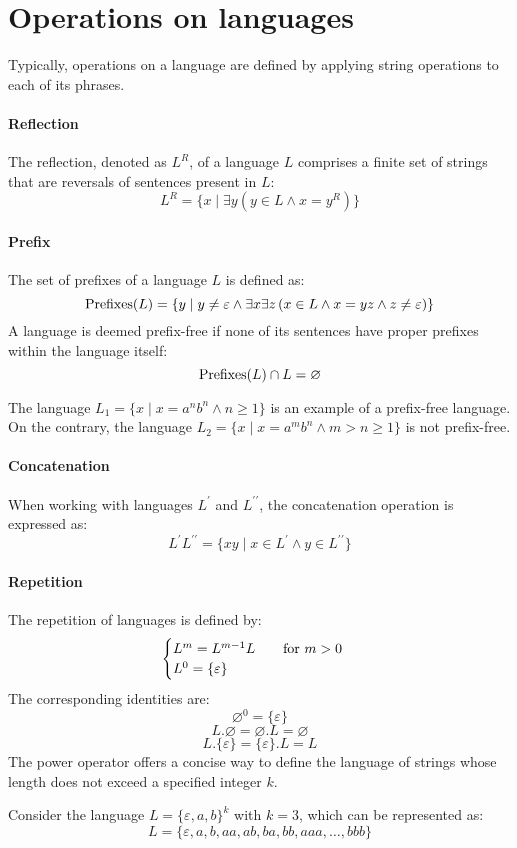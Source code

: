 \section{Operations on languages}

Typically, operations on a language are defined by applying string operations to each of its phrases.

\paragraph*{Reflection}
The reflection, denoted as $L^R$, of a language $L$ comprises a finite set of strings that are reversals of sentences present in $L$:
\[L^R = \{ x \mid \exists y \left( y \in L \land x=y^R \right)\}\]

\paragraph*{Prefix}  
The set of prefixes of a language $L$ is defined as:
\[\textnormal{Prefixes}(L)=\{y \mid y \neq \varepsilon \land \exists x \exists z \left( x \in L \land x=yz \land z \neq \varepsilon \right)\}\]
A language is deemed prefix-free if none of its sentences have proper prefixes within the language itself:
\[\textnormal{Prefixes}(L) \cap L = \varnothing\]
\begin{example}
    The language $L_1=\{x\mid x=a^nb^n \land n \geq 1\}$ is an example of a prefix-free language.
    On the contrary, the language $L_2=\{x\mid x=a^mb^n \land m > n \geq 1\}$ is not prefix-free. 
\end{example}

\paragraph*{Concatenation}  
When working with languages $L^{\prime}$ and $L^{\prime\prime}$, the concatenation operation is expressed as:
\[L^{\prime}L^{\prime\prime}=\{ xy \mid x \in L^{\prime} \land y \in L^{\prime\prime} \}\]

\paragraph*{Repetition}  
The repetition of languages is defined by:
\[ \begin{cases}
    L^m=L^{m-1}L \qquad \textnormal{for } m > 0 \\
    L^0=\{ \varepsilon \}
\end{cases}\]
The corresponding identities are:
\[\varnothing ^0 = \{ \varepsilon \} \]
\[L.\varnothing=\varnothing .L=\varnothing \]
\[L.\{\varepsilon\}=\{\varepsilon\} .L=L\]
The power operator offers a concise way to define the language of strings whose length does not exceed a specified integer $k$.
\begin{example}
    Consider the language $L=\{\varepsilon,a,b\}^k$ with $k=3$, which can be represented as:
    \[L=\{\varepsilon,a,b,aa,ab,ba,bb,aaa,\dots,bbb\}\] 
\end{example}

